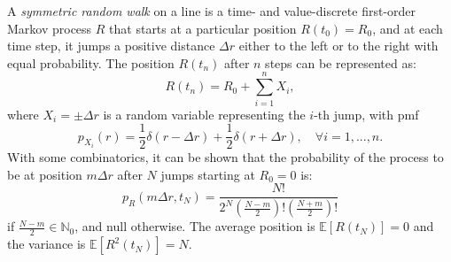 \documentclass[a4paper,12pt]{book}
\begin{document}
A \textit{symmetric random walk} on a line is a time- and value-discrete first-order Markov process $R$ that starts at a particular position $R(t_0) = R_0$, and at each time step, it jumps a positive distance $\Delta r$ either to the left or to the right with equal probability. The position $R(t_n)$ after $n$ steps can be represented as:
\begin{equation}
    R(t_n) = R_0 + \sum_{i=1}^{n} X_i,
\end{equation}
where $X_i= \pm  \Delta r$ is a random variable representing the $i$-th jump, with \acrshort{pmf}
\begin{equation}
    p_{X_i}(r) = \frac{1}{2} \delta(r-\Delta r) + \frac{1}{2} \delta(r+\Delta r), \quad \forall i=1,...,n.
\end{equation}
With some combinatorics, it can be shown that the probability of the process to be at position $m\Delta r$ after $N$ jumps starting at $R_0=0$ is:
\begin{equation}
    p_R(m\Delta r,t_N) = \frac{N!}{2^N(\frac{N-m}{2})!(\frac{N+m}{2})!}
\end{equation}
if $\frac{N-m}{2} \in \mathbb{N}_{0}$, and null otherwise. The average position is $\mathbb{E}[R(t_N)] =0$ and the variance is $\mathbb{E}[R^2(t_N)] =N$.\\
\end{document}
